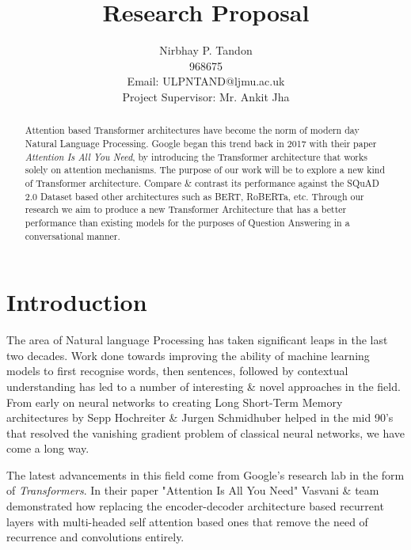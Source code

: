 \documentclass[11pt]{article}
\begin{document}
\title{Research Proposal}

\author{Nirbhay P. Tandon\\968675\\Email: ULPNTAND@ljmu.ac.uk\\
Project Supervisor: Mr. Ankit Jha
}
\date{}
\maketitle


\begin{abstract}
Attention based Transformer architectures have become the norm of modern day Natural Language Processing. Google began this trend back in 2017 with their paper \textit{Attention Is All You Need}\cite{atayl}, by introducing the Transformer architecture that works solely on attention mechanisms. The purpose of our work will be to explore a new kind of Transformer architecture. Compare \& contrast its performance against the SQuAD 2.0 Dataset\cite{dataset} based other architectures such as BERT\cite{bert}, RoBERTa\cite{roberta}, etc. Through our research we aim to produce a new Transformer Architecture that has a better performance than existing models for the purposes of Question Answering in a conversational manner.
\end{abstract}
\newpage
\tableofcontents
\newpage
\section{Introduction}\label{introduction}

The area of Natural language Processing has taken significant leaps in the last two decades. Work done towards improving the ability of machine learning models to first recognise words, then sentences, followed by contextual understanding has led to a number of interesting \& novel approaches in the field. From early on neural networks to creating Long Short-Term Memory architectures\cite{originallstm} by Sepp Hochreiter \& Jurgen Schmidhuber helped in the mid 90's that resolved the vanishing gradient problem of classical neural networks, we have come a long way.

The latest advancements in this field come from Google's research lab in the form of \textit{Transformers}\cite{atayl}. In their paper "Attention Is All You Need"\cite{atayl} Vasvani \& team demonstrated how replacing the encoder-decoder architecture based recurrent layers with multi-headed self attention based ones that remove the need of recurrence and convolutions entirely.
\end{document}
